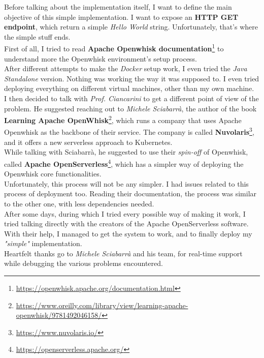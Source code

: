 Before talking about the implementation itself, I want to define the main objective of this simple implementation. I want to expose an \textbf{HTTP GET endpoint}, which return a simple \textit{Hello World} string. Unfortunately, that's where the simple stuff ends.\vspace{14pt}\\
First of all, I tried to read \textbf{Apache Openwhisk documentation}\footnote{\url{https://openwhisk.apache.org/documentation.html}} to understand more the Openwhisk environment's setup process.\\
After different attempts to make the \textit{Docker} setup work, I even tried the \textit{Java Standalone} version. Nothing was working the way it was supposed to. I even tried deploying everything on different virtual machines, other than my own machine.\vspace{14pt}\\
I then decided to talk with \textit{Prof. Ciancarini} to get a different point of view of the problem. He suggested reaching out to \textit{Michele Sciabarrà}, the author of the book \textbf{Learning Apache OpenWhisk}\footnote{\url{https://www.oreilly.com/library/view/learning-apache-openwhisk/9781492046158/}}, which runs a company that uses Apache Openwhisk as the backbone of their service. The company is called \textbf{Nuvolaris}\footnote{\url{https://www.nuvolaris.io/}}, and it offers a new serverless approach to Kubernetes.\\
While talking with Sciabarrà, he suggested to use their \textit{spin-off} of Openwhisk, called \textbf{Apache OpenServerless}\footnote{\url{https://openserverless.apache.org/}}, which has a simpler way of deploying the Openwhisk core functionalities.\vspace{14pt}\\
Unfortunately, this process will not be any simpler. I had issues related to this process of deployment too. Reading their documentation, the process was similar to the other one, with less dependencies needed.\\
After some days, during which I tried every possible way of making it work, I tried talking directly with the creators of the Apache OpenServerless software. With their help, I managed to get the system to work, and to finally deploy my \textit{"simple"} implementation.\vspace{14pt}\\
Heartfelt thanks go to \textit{Michele Sciabarrà} and his team, for real-time support while debugging the various problems encountered.\\
